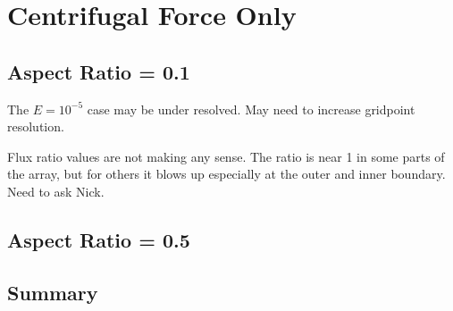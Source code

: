 \section{Centrifugal Force Only}

\subsection{Aspect Ratio = 0.1}

The $E=10^{-5}$ case may be under resolved. May need to increase gridpoint resolution. 

\keradius

\azavgtemperature

\azavgomega
 
\azavgmassflux

\fluxpol

\fluxeq

\condfluxrin

\condfluxrout

\forcebalancesmallar

\clearpage

Flux ratio values are not making any sense. The ratio is near 1 in some parts of the array, but for others it blows up especially at the outer and inner boundary. Need to ask Nick.

\ekfixtable

\clearpage

\subsection{Aspect Ratio = 0.5}


\keradiusarfive

\azavgtemperaturearfive

\azavgomegaarfive

\azavgmassfluxarfive

\condfluxrinarbig

\condfluxroutarbig

\centrifugaltablearfive

\clearpage

\subsection{Summary}

\kevek
